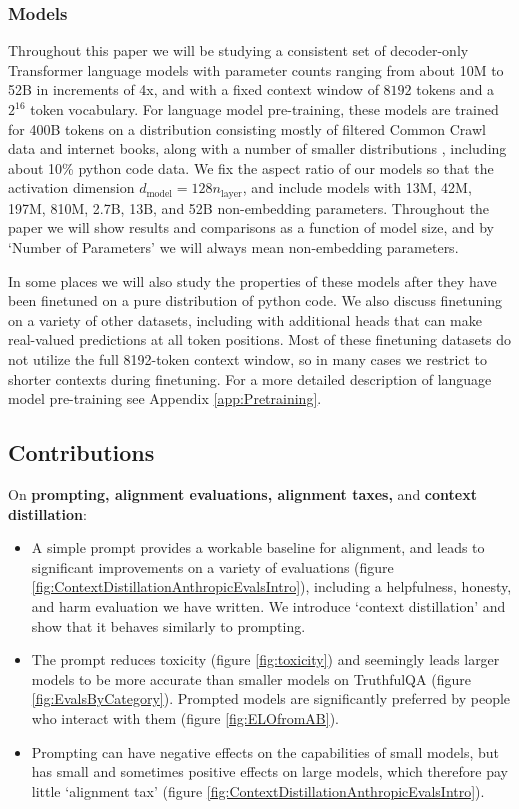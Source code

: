 \subsubsection*{Models}

Throughout this paper we will be studying a consistent set of decoder-only Transformer language models with parameter counts ranging from about 10M to 52B in increments of 4x, and with a fixed context window of $8192$ tokens and a $2^{16}$ token vocabulary.  For language model pre-training, these models are trained for 400B tokens on a distribution consisting mostly of filtered Common Crawl data \cite{commoncrawl} and internet books, along with a number of smaller distributions \cite{gao2020pile}, including about 10\% python code data.  We fix the aspect ratio of our models so that the activation dimension $d_{\mathrm{model}} = 128 n_{\mathrm{ layer}}$, and include models with 13M, 42M, 197M, 810M, 2.7B, 13B, and 52B non-embedding parameters.  Throughout the paper we will show results and comparisons as a function of model size, and by `Number of Parameters' we will always mean non-embedding parameters.

In some places we will also study the properties of these models after they have been finetuned on a pure distribution of python code.  We also discuss finetuning on a variety of other datasets, including with additional heads that can make real-valued predictions at all token positions.  Most of these finetuning datasets do not utilize the full 8192-token context window, so in many cases we restrict to shorter contexts during finetuning. For a more detailed description of language model pre-training see Appendix \ref{app:Pretraining}. 

\subsection{Contributions}

On {\bf prompting, alignment evaluations, alignment taxes,} and {\bf context distillation}:

\begin{itemize}
    \item A simple prompt provides a workable baseline for alignment, and leads to significant improvements on a variety of evaluations (figure \ref{fig:ContextDistillationAnthropicEvalsIntro}), including a helpfulness, honesty, and harm evaluation we have written.  We introduce `context distillation' and show that it behaves similarly to prompting.
    \item The prompt reduces toxicity \cite{gehman2020realtoxicityprompts} (figure \ref{fig:toxicity}) and seemingly leads larger models to be more accurate than smaller models on TruthfulQA \cite{lin2021truthfulqa} (figure \ref{fig:EvalsByCategory}).  Prompted models are significantly preferred by people who interact with them (figure \ref{fig:ELOfromAB}).
    \item Prompting can have negative effects on the capabilities of small models, but has small and sometimes positive effects on large models, which therefore pay little  `alignment tax' (figure \ref{fig:ContextDistillationAnthropicEvalsIntro}). 
\end{itemize}

